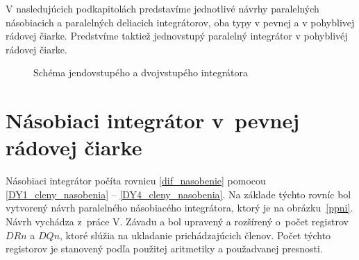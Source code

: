 V nasledujúcich podkapitolách predstavíme jednotlivé návrhy paralelných násobiacich a paralelných deliacich integrátorov, oba typy v pevnej a v pohyblivej rádovej čiarke. Predstvíme taktiež jednovstupý paralelný integrátor v pohyblivéj rádovej čiarke.
\bigskip


\begin{figure}[h]
\centering
{} \hspace{1.0cm}
\label{schema_i_ndi}
\caption{Schéma jendovstupého a dvojvstupého integrátora}
\end{figure}



\section{Násobiaci integrátor v~pevnej rádovej čiarke}
Násobiaci integrátor počíta rovnicu \eqref{dif_nasobenie} pomocou \eqref{DY1_cleny_nasobenia} -- \eqref{DY4_cleny_nasobenia}. Na základe týchto rovníc bol vytvorený návrh paralelného násobiacého integrátora, ktorý je na obrázku~\ref{ppni}. Návrh vychádza z~práce V. Závadu \cite{ZavadaBP} a bol upravený a rozšírený o~počet registrov $ DRn $ a $ DQn $, ktoré slúžia na ukladanie prichádzajúcich členov. Počet týchto registorov je stanovený podľa použitej aritmetiky a použadvanej presnosti.

